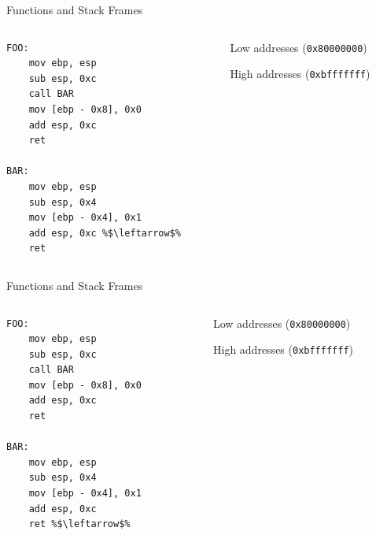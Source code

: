 \documentclass[]{beamer}
\begin{document}
\begin{frame}[fragile]{Functions and Stack Frames}
  \begin{columns}
    \begin{column}{0.45\linewidth}
      \begin{lstlisting}[language={[x86masm]Assembler}, escapechar=\%]
FOO:
    mov ebp, esp 
    sub esp, 0xc 
    call BAR 
    mov [ebp - 0x8], 0x0 
    add esp, 0xc 
    ret

BAR:
    mov ebp, esp 
    sub esp, 0x4 
    mov [ebp - 0x4], 0x1 
    add esp, 0xc %$\leftarrow$%
    ret
      \end{lstlisting}
    \end{column}
    \begin{column}{0.4\linewidth}
      \par
      {\scriptsize Low addresses ({\tt 0x80000000})}\\[.5em]
      {\scriptsize High addresses ({\tt 0xbfffffff})}
    \end{column}
  \end{columns}
\end{frame}

\begin{frame}[fragile]{Functions and Stack Frames}
  \begin{columns}
    \begin{column}{0.45\linewidth}
      \begin{lstlisting}[language={[x86masm]Assembler}, escapechar=\%]
FOO:
    mov ebp, esp 
    sub esp, 0xc 
    call BAR 
    mov [ebp - 0x8], 0x0 
    add esp, 0xc 
    ret

BAR:
    mov ebp, esp 
    sub esp, 0x4 
    mov [ebp - 0x4], 0x1 
    add esp, 0xc 
    ret %$\leftarrow$%
      \end{lstlisting}
    \end{column}
    \begin{column}{0.4\linewidth}
      \par
      {\scriptsize Low addresses ({\tt 0x80000000})}\\[.5em]
      {\scriptsize High addresses ({\tt 0xbfffffff})}
    \end{column}
  \end{columns}
\end{frame}
\end{document}
